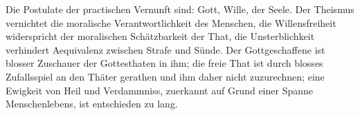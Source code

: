 Die Postulate der practischen Vernunft sind:  Gott,  Wille,  der Seele. Der Theismus vernichtet die moralische Verantwortlichkeit des Menschen, die Willensfreiheit widerspricht der moralischen Schätzbarkeit der That, die Unsterblichkeit verhindert Aequivalenz zwischen Strafe und Sünde. Der Gottgeschaffene ist blosser Zuschauer der Gottesthaten in ihm; die freie That ist durch blosses Zufallsspiel an den Thäter gerathen und ihm daher nicht zuzurechnen; eine Ewigkeit von Heil und Verdammniss, zuerkannt auf Grund einer Spanne Menschenlebens, ist entschieden zu lang.
\par

